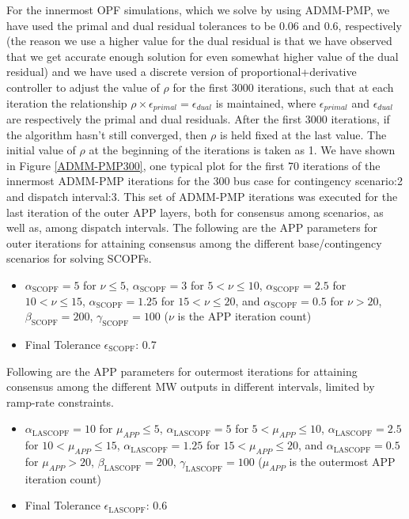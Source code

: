 \documentclass[preprint,12pt,3p]{elsarticle}
\begin{document}
	For the innermost OPF simulations, which we solve by using ADMM-PMP, we have used the primal and dual residual tolerances to be 0.06 and 0.6, respectively (the reason we use a higher value for the dual residual is that we have observed that we get accurate enough solution for even somewhat higher value of the dual residual) and we have used a discrete version of proportional+derivative controller to adjust the value of $\rho$ for the first 3000 iterations, such that at each iteration the relationship $\rho\times\epsilon_{primal}=\epsilon_{dual}$ is maintained, where $\epsilon_{primal}$ and $\epsilon_{dual}$ are respectively the primal and dual residuals. After the first 3000 iterations, if the algorithm hasn't still converged, then $\rho$ is held fixed at the last value. The initial value of $\rho$ at the beginning of the iterations is taken as 1. We have shown in Figure \ref{ADMM-PMP300}, one typical plot for the first 70 iterations of the innermost ADMM-PMP iterations for the 300 bus case for contingency scenario:2 and dispatch interval:3. This set of ADMM-PMP iterations was executed for the last iteration of the outer APP layers, both for consensus among scenarios, as well as, among dispatch intervals. The following are the APP parameters for outer iterations for attaining consensus among the different base/contingency scenarios for solving SCOPFs.
	\begin{itemize}
		\item $\alpha_{\text{SCOPF}}=5$ for $\nu\leq5$, $\alpha_{\text{SCOPF}}=3$ for $5<\nu\leq10$, $\alpha_{\text{SCOPF}}=2.5$ for $10<\nu\leq15$, $\alpha_{\text{SCOPF}}=1.25$ for $15<\nu\leq20$, and $\alpha_{\text{SCOPF}}=0.5$ for $\nu>20$, $\beta_{\text{SCOPF}}=200$, $\gamma_{\text{SCOPF}}=100$ ($\nu$ is the APP iteration count)
		\item Final Tolerance $\epsilon_{\text{SCOPF}}$: 0.7
	\end{itemize}
	Following are the APP parameters for outermost iterations for attaining consensus among the different MW outputs in different intervals, limited by ramp-rate constraints.
	\begin{itemize}
		\item $\alpha_{\text{LASCOPF}}=10$ for $\mu_{APP}\leq5$, $\alpha_{\text{LASCOPF}}=5$ for $5<\mu_{APP}\leq10$, $\alpha_{\text{LASCOPF}}=2.5$ for $10<\mu_{APP}\leq15$, $\alpha_{\text{LASCOPF}}=1.25$ for $15<\mu_{APP}\leq20$, and $\alpha_{\text{LASCOPF}}=0.5$ for $\mu_{APP}>20$, $\beta_{\text{LASCOPF}}=200$, $\gamma_{\text{LASCOPF}}=100$ ($\mu_{APP}$ is the outermost APP iteration count)
		\item Final Tolerance $\epsilon_{\text{LASCOPF}}$: 0.6
	\end{itemize}
\end{document}
